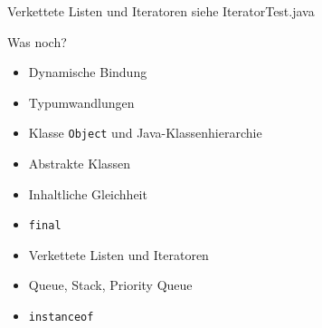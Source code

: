 \documentclass[18pt]{beamer}
\begin{document}
\begin{frame}{Verkettete Listen und Iteratoren}
 siehe IteratorTest.java
\end{frame}


\begin{frame}[fragile]{Was noch?}
\begin{itemize}
 \item Dynamische Bindung \checkmark
 \item Typumwandlungen \checkmark
 \item Klasse \verb|Object| und Java-Klassenhierarchie \checkmark
 \item Abstrakte Klassen \checkmark
 \item Inhaltliche Gleichheit \checkmark
 \item \verb|final| \checkmark
 \item Verkettete Listen und Iteratoren \checkmark
 \item Queue, Stack, Priority Queue
 \item \verb|instanceof|
\end{itemize}
\end{frame}
\end{document}
